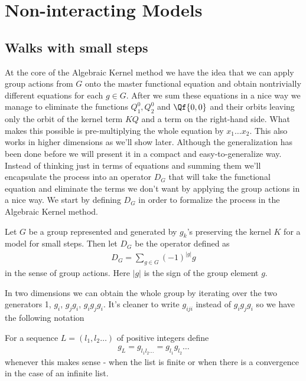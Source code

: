 \section{Non-interacting Models}
\subsection{Walks with small steps}
At the core of the Algebraic Kernel method we have the idea that we can apply group actions from $G$ onto the master functional equation and obtain nontrivially different equations for each $g\in  G$. After we sum these equations in a nice way we manage to eliminate the functions $Q_1^0,Q_2^0$ and $\Qf{0,0}$ and their orbits leaving only the orbit of the kernel term $KQ$ and a term on the right-hand side. What makes this possible is pre-multiplying the whole equation by $x_1\ldots x_2$. This also works in higher dimensions as we'll show later. Although the generalization has been done before we will present it in a compact and easy-to-generalize way. Instead of thinking just in terms of equations and summing them we'll encapsulate the process into an operator $D_G$ that will take the functional equation and eliminate the terms we don't want by applying the group actions in a nice way. We start by defining $D_G$ in order to formalize the process in the Algebraic Kernel method.
\begin{definition} Let $G$ be a group represented and generated by $g_k$'s preserving the kernel $K$ for a model for small steps. Then let $D_G$ be the operator defined as
\begin{align}
	D_G = \sum_{g\in G} (-1)^{|g|}g
\end{align}
in the sense of group actions. Here $|g|$ is the sign of the group element $g$.
\end{definition}
In two dimensions we can obtain the whole group by iterating over the two generators 1, $g_i$, $g_jg_i$, $g_ig_jg_i$. It's cleaner to write $g_{iji}$ instead of $g_ig_jg_i$ so we have the following notation
\begin{definition} For a sequence $L = (l_1,l_2\ldots)$ of positive integers define 
\begin{align}
	g_L = g_{l_1l_2\ldots} = g_{l_1}g_{l_2}\ldots
\end{align} 
whenever this makes sense - when the list is finite or when there is a convergence in the case of an infinite list.
\end{definition}
